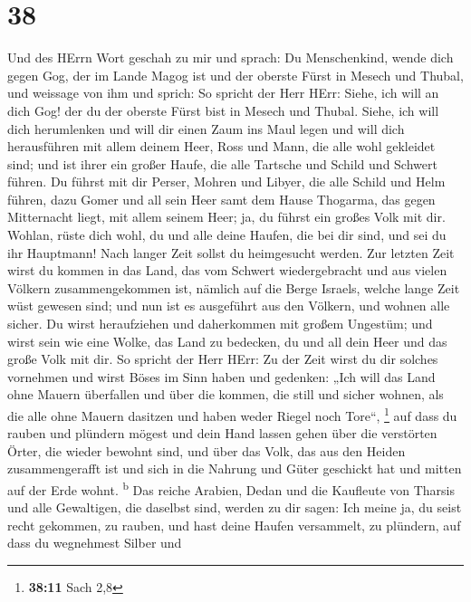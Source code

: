 \hypertarget{section-37}{%
\section{38}\label{section-37}}

 Und des HErrn Wort geschah zu mir und sprach:
 Du Menschenkind, wende dich gegen Gog, der im Lande Magog
ist und der oberste Fürst in Mesech und Thubal, und weissage von ihm
 und sprich: So spricht der Herr HErr: Siehe, ich will an
dich Gog! der du der oberste Fürst bist in Mesech und Thubal.
 Siehe, ich will dich herumlenken und will dir einen Zaum
ins Maul legen und will dich herausführen mit allem deinem Heer, Ross
und Mann, die alle wohl gekleidet sind; und ist ihrer ein großer Haufe,
die alle Tartsche und Schild und Schwert führen.  Du
führst mit dir Perser, Mohren und Libyer, die alle Schild und Helm
führen,  dazu Gomer und all sein Heer samt dem Hause
Thogarma, das gegen Mitternacht liegt, mit allem seinem Heer; ja, du
führst ein großes Volk mit dir.  Wohlan, rüste dich wohl,
du und alle deine Haufen, die bei dir sind, und sei du ihr Hauptmann!
 Nach langer Zeit sollst du heimgesucht werden. Zur
letzten Zeit wirst du kommen in das Land, das vom Schwert wiedergebracht
und aus vielen Völkern zusammengekommen ist, nämlich auf die Berge
Israels, welche lange Zeit wüst gewesen sind; und nun ist es ausgeführt
aus den Völkern, und wohnen alle sicher.  Du wirst
heraufziehen und daherkommen mit großem Ungestüm; und wirst sein wie
eine Wolke, das Land zu bedecken, du und all dein Heer und das große
Volk mit dir.  So spricht der Herr HErr: Zu der Zeit
wirst du dir solches vornehmen und wirst Böses im Sinn haben
 und gedenken: „Ich will das Land ohne Mauern überfallen
und über die kommen, die still und sicher wohnen, als die alle ohne
Mauern dasitzen und haben weder Riegel noch Tore``, \footnote{\textbf{38:11}
  Sach 2,8}  auf dass du rauben und plündern mögest und
dein Hand lassen gehen über die verstörten Örter, die wieder bewohnt
sind, und über das Volk, das aus den Heiden zusammengerafft ist und sich
in die Nahrung und Güter geschickt hat und mitten auf der Erde wohnt.
\textsuperscript{b}  Das reiche Arabien, Dedan und die
Kaufleute von Tharsis und alle Gewaltigen, die daselbst sind, werden zu
dir sagen: Ich meine ja, du seist recht gekommen, zu rauben, und hast
deine Haufen versammelt, zu plündern, auf dass du wegnehmest Silber und
